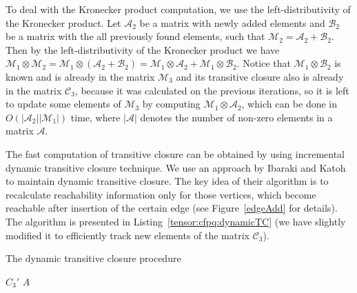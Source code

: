 To deal with the Kronecker product computation, we use the left-distributivity of the Kronecker product. Let $\mathcal{A}_2$ be a matrix with newly added elements and $\mathcal{B}_2$ be a matrix with the all previously found elements, such that $\mathcal{M}_2 = \mathcal{A}_2 + \mathcal{B}_2$. Then by the left-distributivity of the Kronecker product we have $\mathcal{M}_1 \otimes \mathcal{M}_2 = \mathcal{M}_1 \otimes (\mathcal{A}_2 + \mathcal{B}_2) = \mathcal{M}_1\otimes \mathcal{A}_2 + \mathcal{M}_1 \otimes \mathcal{B}_2$. Notice that $\mathcal{M}_1 \otimes \mathcal{B}_2$ is known and is already in the matrix $\mathcal{M}_3$ and its transitive closure also is already in the matrix $\mathcal{C}_3$, because it was calculated on the previous iterations, so it is left to update some elements of $\mathcal{M}_3$ by computing $\mathcal{M}_1\otimes \mathcal{A}_2$, which can be done in $O(|\mathcal{A}_2||\mathcal{M}_1|)$ time, where $|\mathcal{A}|$ denotes the number of non-zero elements in a matrix $\mathcal{A}$.


The fast computation of transitive closure can be obtained by using incremental dynamic transitive closure technique. We use an approach by Ibaraki and Katoh~\cite{IBARAKI198395} to maintain dynamic transitive closure. The key idea of their algorithm is to recalculate reachability information only for those vertices, which become reachable after insertion of the certain edge (see Figure~\ref{edgeAdd} for details). The algorithm is presented in Listing~\ref{tensor:cfpq:dynamicTC} (we have slightly modified it to efficiently track new elements of the matrix $\mathcal{C}_3$). 

\begin{algorithm}[h]
\begin{algorithmic}[1]
\footnotesize
\caption{The dynamic transitive closure procedure}
\label{tensor:cfpq:dynamicTC}
        \EndFor
        \State \Return $C_3'$
\EndFunction
        \EndFor
\State \Return $A$
\EndFunction
\EndFunction
\end{algorithmic}
\end{algorithm}


